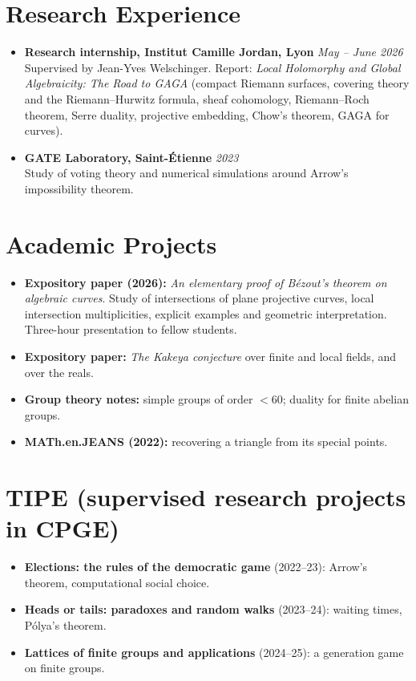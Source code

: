 \documentclass[11pt,a4paper]{article}
\begin{document}
	\section*{Research Experience}
	\begin{itemize}[leftmargin=1em, label={}]
		\item \textbf{Research internship, Institut Camille Jordan, Lyon} \hfill \textit{May -- June 2026} \\
		Supervised by Jean-Yves Welschinger. Report: \textit{Local Holomorphy and Global Algebraicity: The Road to GAGA} (compact Riemann surfaces, covering theory and the Riemann--Hurwitz formula, sheaf cohomology, Riemann--Roch theorem, Serre duality, projective embedding, Chow's theorem, GAGA for curves).
		\vspace{0.02cm}
		
		\item \textbf{GATE Laboratory, Saint-Étienne} \hfill \textit{2023} \\
		Study of voting theory and numerical simulations around Arrow's impossibility theorem.
	\end{itemize}
	
	\section*{Academic Projects}
	\begin{itemize}[leftmargin=1.5em, label=\textbullet, itemsep=2pt]
		\item \textbf{Expository paper (2026):} \textit{An elementary proof of Bézout's theorem on algebraic curves}. Study of intersections of plane projective curves, local intersection multiplicities, explicit examples and geometric interpretation. Three-hour presentation to fellow students.
		\item \textbf{Expository paper:} \textit{The Kakeya conjecture} over finite and local fields, and over the reals.
		\item \textbf{Group theory notes:} simple groups of order $< 60$; duality for finite abelian groups.
		\item \textbf{MATh.en.JEANS (2022):} recovering a triangle from its special points.
	\end{itemize}

	\section*{TIPE (supervised research projects in CPGE)}
	\begin{itemize}[leftmargin=1.5em, label=\textbullet, itemsep=2pt]
		\item \textbf{Elections: the rules of the democratic game} (2022--23): Arrow's theorem, computational social choice.
		\item \textbf{Heads or tails: paradoxes and random walks} (2023--24): waiting times, Pólya's theorem.
		\item \textbf{Lattices of finite groups and applications} (2024--25): a generation game on finite groups.
	\end{itemize}
	
\end{document}
